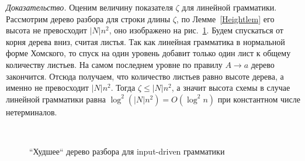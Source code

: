 \textit{Доказательство.} Оценим величину показателя $\zeta$ для линейной грамматики. Рассмотрим дерево разбора для строки длины $\zeta$, по Лемме~\ref{Heightlem} его высота не превосходит $|N|n^2$, оно изображено на рис.~\ref{Linw}. Будем спускаться от корня дерева вниз, считая листья. Так как линейная грамматика в нормальной форме Хомского, то спуск на один уровень добавит только один лист к общему количеству листьев. На самом последнем уровне по правилу $A \rightarrow a$ дерево закончится. Отсюда получаем, что количество листьев равно высоте дерева, а именно не превосходит $|N|n^2$. Тогда  $\zeta \le |N|n^2$, а значит высота схемы в случае линейной грамматики равна $\log^2(|N|n^2) = O(\log^2 n)$ при константном числе нетерминалов.

\begin{figure}
\centering

 \\
	\caption{``Худшее`` дерево разбора для input-driven грамматики}
\label{Linw}
\end{figure}
